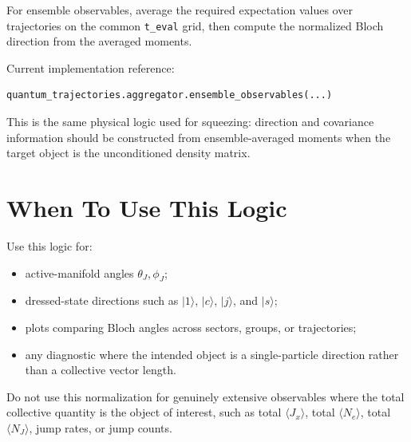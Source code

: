 \documentclass[11pt]{article}
\begin{document}
For ensemble observables, average the required expectation values over
trajectories on the common \texttt{t\_eval} grid, then compute the normalized
Bloch direction from the averaged moments.

Current implementation reference:

\begin{verbatim}
quantum_trajectories.aggregator.ensemble_observables(...)
\end{verbatim}

This is the same physical logic used for squeezing: direction and covariance
information should be constructed from ensemble-averaged moments when the target
object is the unconditioned density matrix.

\section*{When To Use This Logic}

Use this logic for:

\begin{itemize}
\item active-manifold angles \(\theta_J,\phi_J\);
\item dressed-state directions such as \(|1\rangle\), \(|c\rangle\),
  \(|j\rangle\), and \(|s\rangle\);
\item plots comparing Bloch angles across sectors, groups, or trajectories;
\item any diagnostic where the intended object is a single-particle direction
  rather than a collective vector length.
\end{itemize}

Do not use this normalization for genuinely extensive observables where the
total collective quantity is the object of interest, such as total
\(\langle J_x\rangle\), total \(\langle N_e\rangle\), total
\(\langle N_J\rangle\), jump rates, or jump counts.
\end{document}
